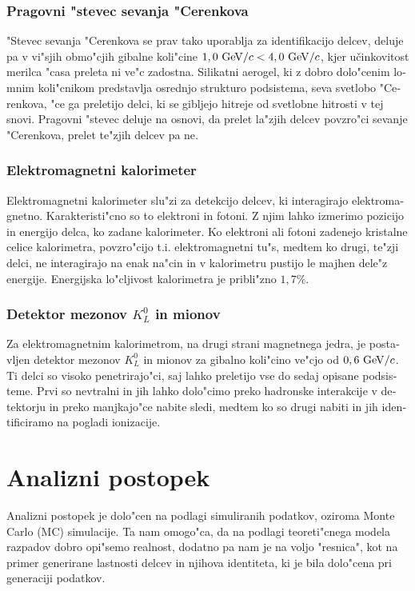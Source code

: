 \begin{otherlanguage}{slovene}
\subsubsection{Pragovni "stevec sevanja "Cerenkova}
"Stevec sevanja "Cerenkova se prav tako uporablja za identifikacijo delcev, deluje pa v vi"sjih obmo"cjih gibalne koli"cine $1,0\mathrm{~GeV}/c < 4,0\mathrm{~GeV}/c$, kjer učinkovitost merilca "casa preleta ni ve"c zadostna. Silikatni aerogel, ki z dobro dolo"cenim lomnim koli"cnikom predstavlja osrednjo strukturo podsistema, seva svetlobo "Cerenkova, "ce ga preletijo delci, ki se gibljejo hitreje od svetlobne hitrosti v tej snovi. Pragovni "stevec deluje na osnovi, da prelet la"zjih delcev povzro"ci sevanje "Cerenkova, prelet te"zjih delcev pa ne.

\subsubsection{Elektromagnetni kalorimeter}
Elektromagnetni kalorimeter slu"zi za detekcijo delcev, ki interagirajo elektromagnetno. Karakteristi"cno so to elektroni in fotoni. Z njim lahko izmerimo pozicijo in energijo delca, ko zadane kalorimeter. Ko elektroni ali fotoni zadenejo kristalne celice kalorimetra, povzro"cijo t.i. elektromagnetni tu"s, medtem ko drugi, te"zji delci, ne interagirajo na enak na"cin in v kalorimetru pustijo le majhen dele"z energije. Energijska lo"cljivost kalorimetra je pribli"zno $1,7\%$.

\subsubsection{Detektor mezonov $K_L^0$ in mionov}
Za elektromagnetnim kalorimetrom, na drugi strani magnetnega jedra, je postavljen detektor mezonov $K_L^0$ in mionov za gibalno koli"cino ve"cjo od $0,6\mathrm{~GeV}/c$. Ti delci so visoko penetrirajo"ci, saj lahko preletijo vse do sedaj opisane podsisteme. Prvi so nevtralni in jih lahko dolo"cimo preko hadronske interakcije v detektorju in preko manjkajo"ce nabite sledi, medtem ko so drugi nabiti in jih identificiramo na pogladi ionizacije.

\section{Analizni postopek}
Analizni postopek je dolo"cen na podlagi simuliranih podatkov, oziroma Monte Carlo (MC) simulacije. Ta nam omogo"ca, da na podlagi teoreti"cnega modela razpadov dobro opi"semo realnost, dodatno pa nam je na voljo "resnica", kot na primer generirane lastnosti delcev in njihova identiteta, ki je bila dolo"cena pri generaciji podatkov.


\end{otherlanguage}
